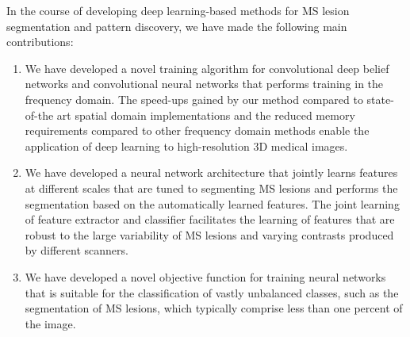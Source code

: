 In the course of developing deep learning-based methods for MS lesion
segmentation and pattern discovery, we have made the following main
contributions:
\begin{enumerate}
\item We have developed a novel training algorithm for convolutional deep belief
networks and convolutional neural networks that performs training in the
frequency domain. The speed-ups gained by our method compared to state-of-the
art spatial domain implementations and the reduced memory requirements compared
to other frequency domain methods enable the application of deep learning to
high-resolution 3D medical images.
  
\item We have developed a neural network architecture that jointly learns
features at different scales that are tuned to segmenting MS lesions and
performs the segmentation based on the automatically learned features. The joint
learning of feature extractor and classifier facilitates the learning of
features that are robust to the large variability of MS lesions and varying
contrasts produced by different scanners.




\item We have developed a novel objective function for training neural networks
that is suitable for the classification of vastly unbalanced classes, such as
the segmentation of MS lesions, which typically comprise less than one percent
of the image.


\end{enumerate}
